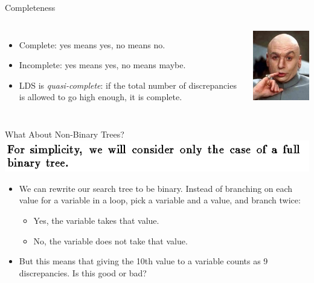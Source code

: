 \documentclass{beamer}
\begin{document}
\begin{frame}{Completeness}
    \begin{columns}
        \begin{itemize}
            \item Complete: yes means yes, no means no.
            \item Incomplete: yes means yes, no means maybe.
            \item LDS is \emph{quasi-complete}: if the total number of discrepancies is allowed to go
                high enough, it is complete.
        \end{itemize}
        \centering\includegraphics*[keepaspectratio=true,scale=0.4]{images/quasi.jpg}
    \end{columns}
\end{frame}

\begin{frame}{What About Non-Binary Trees?}
    \centering\includegraphics*[keepaspectratio=true,scale=0.4]{images/lds-binary.png}

    \vspace{1em}

    \begin{itemize}
        \item We can rewrite our search tree to be binary. Instead of branching on each value for a
            variable in a loop, pick a variable and a value, and branch twice:

            \begin{itemize}
                \item Yes, the variable takes that value.
                \item No, the variable does not take that value.
            \end{itemize}

        \item But this means that giving the 10th value to a variable counts as 9 discrepancies. Is
            this good or bad?
    \end{itemize}
\end{frame}
\end{document}
